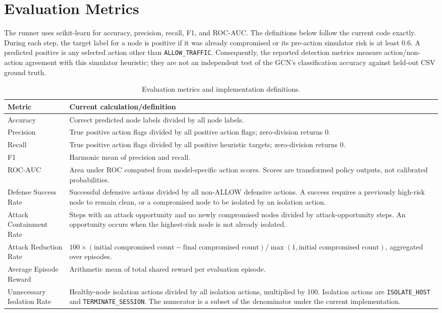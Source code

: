 \documentclass[12pt,a4paper]{report}
\newcommand{\code}[1]{\texttt{#1}}
\begin{document}
\section{Evaluation Metrics}

The runner uses scikit-learn for accuracy, precision, recall, F1, and ROC-AUC. The definitions below follow the current code exactly. During each step, the target label for a node is positive if it was already compromised or its pre-action simulator risk is at least 0.6. A predicted positive is any selected action other than \code{ALLOW\_TRAFFIC}. Consequently, the reported detection metrics measure action/non-action agreement with this simulator heuristic; they are not an independent test of the GCN's classification accuracy against held-out CSV ground truth.

\begin{table}[htbp]
\centering
\caption{Evaluation metrics and implementation definitions.}
\small
\begin{tabularx}{\textwidth}{>{\raggedright\arraybackslash}p{}X}
\toprule
\textbf{Metric} & \textbf{Current calculation/definition} \\
\midrule
Accuracy & Correct predicted node labels divided by all node labels. \\
Precision & True positive action flags divided by all positive action flags; zero-division returns 0. \\
Recall & True positive action flags divided by all positive heuristic targets; zero-division returns 0. \\
F1 & Harmonic mean of precision and recall. \\
ROC-AUC & Area under ROC computed from model-specific action scores. Scores are transformed policy outputs, not calibrated probabilities. \\
Defense Success Rate & Successful defensive actions divided by all non-ALLOW defensive actions. A success requires a previously high-risk node to remain clean, or a compromised node to be isolated by an isolation action. \\
Attack Containment Rate & Steps with an attack opportunity and no newly compromised nodes divided by attack-opportunity steps. An opportunity occurs when the highest-risk node is not already isolated. \\
Attack Reduction Rate & $100\times(\text{initial compromised count}-\text{final compromised count})/\max(1,\text{initial compromised count})$, aggregated over episodes. \\
Average Episode Reward & Arithmetic mean of total shared reward per evaluation episode. \\
Unnecessary Isolation Rate & Healthy-node isolation actions divided by all isolation actions, multiplied by 100. Isolation actions are \code{ISOLATE\_HOST} and \code{TERMINATE\_SESSION}. The numerator is a subset of the denominator under the current implementation. \\
\bottomrule
\end{tabularx}
\end{table}
\end{document}
